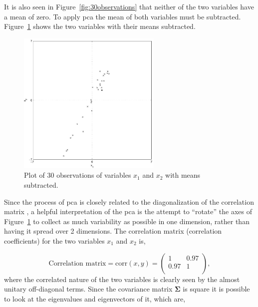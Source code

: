 It is also seen in Figure~\ref{fig:30observations} that neither of the two variables have a mean of zero. To apply \gls{pca} the mean of both variables must be subtracted. Figure~\ref{fig:30observationsBar} shows the two variables with their means subtracted.
\begin{figure}[!]
  \begin{center}
    \includegraphics[width=260px]{30observationsBar.pdf}
    \caption{Plot of 30 observations of variables $x_1$ and $x_2$ with means subtracted.}\label{fig:30observationsBar}
  \end{center}
\end{figure}

Since the process of \gls{pca} is closely related to the diagonalization of the correlation matrix \citep[p. 174]{Therrien1992}, a helpful interpretation of the \gls{pca} is the attempt to ``rotate'' the axes of Figure~\ref{fig:30observationsBar} to collect as much variability as possible in one dimension, rather than having it spread over 2 dimensions. The correlation matrix (correlation coefficients) for the two variables $x_1$ and $x_2$ is,

\begin{equation}\label{eq:corrcoef}
\textrm{Correlation matrix} = \textrm{corr}(x,y)= \left(
    \begin{array}{cc}
        1   & 0.97 \\
        0.97& 1    \\
    \end{array}\right),
\end{equation}
where the correlated nature of the two variables is clearly seen by the almost unitary off-diagonal terms. Since the covariance matrix $\boldsymbol\Sigma$ is square it is possible to look at the eigenvalues and eigenvectors of it, which are,

